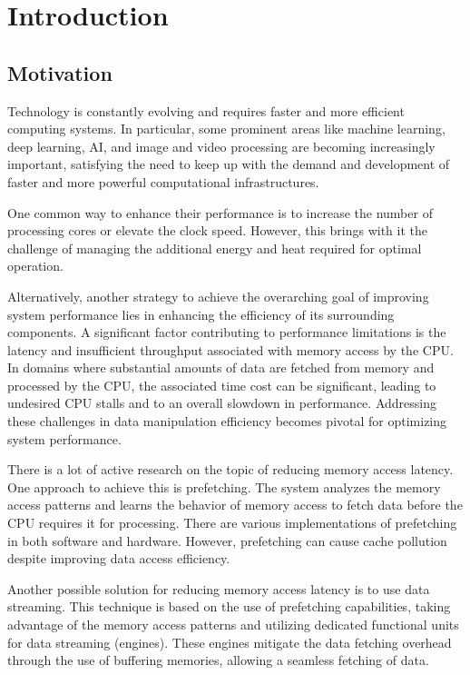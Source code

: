 
\chapter{Introduction}
\label{chapter:introduction}

\section{Motivation}

Technology is constantly evolving and requires faster and more efficient computing systems. In particular, some prominent areas like machine learning, deep learning, AI, and image and video processing are becoming increasingly important, satisfying the need to keep up with the demand and development of faster and more powerful computational infrastructures.

One common way to enhance their performance is to increase the number of processing cores or elevate the clock speed. However, this brings with it the challenge of managing the additional energy and heat required for optimal operation.

Alternatively, another strategy to achieve the overarching goal of improving system performance lies in enhancing the efficiency of its surrounding components. A significant factor contributing to performance limitations is the latency and insufficient throughput associated with memory access by the CPU. In domains where substantial amounts of data are fetched from memory and processed by the CPU, the associated time cost can be significant, leading to undesired CPU stalls and to an overall slowdown in performance. Addressing these challenges in data manipulation efficiency becomes pivotal for optimizing system performance.

There is a lot of active research on the topic of reducing memory access latency. One approach to achieve this is prefetching. The system analyzes the memory access patterns and learns the behavior of memory access to fetch data before the CPU requires it for processing. There are various implementations of prefetching in both software and hardware. However, prefetching can cause cache pollution despite improving data access efficiency.

Another possible solution for reducing memory access latency is to use data streaming. This technique is based on the use of prefetching capabilities, taking advantage of the memory access patterns and utilizing dedicated functional units for data streaming (engines). These engines mitigate the data fetching overhead through the use of buffering memories, allowing a seamless fetching of data. 


